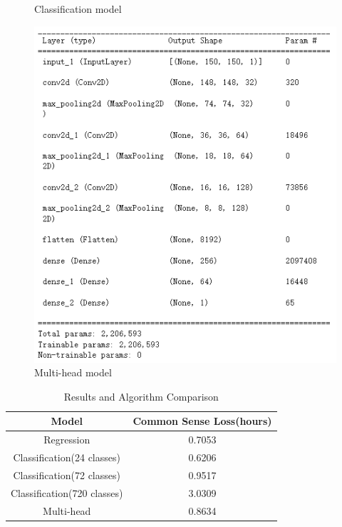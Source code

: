 \documentclass{article}
\begin{document}
\begin{figure}[!h]
\begin{minipage}[t]{0.3\textwidth}
		\caption{Classification model}
		\label{fig:classification}
	\end{minipage}
	\begin{minipage}[t]{0.3\textwidth}%
		\centering
		\includegraphics[width=\textwidth]{regression.png}
		\caption{Multi-head model}
		\label{fig:multi-head}
	\end{minipage}
\end{figure}
    \begin{table}[!ht]
	\caption{Results and Algorithm Comparison}
	\label{tab:performance}
	\centering
	\begin{tabular}{cc}
		\toprule
		\textbf{Model} & \textbf{Common Sense Loss(hours)} \\
		\midrule
		Regression & 0.7053 \\
		Classification(24 classes) & 0.6206 \\
		Classification(72 classes) & 0.9517 \\
		Classification(720 classes) & 3.0309 \\
		Multi-head & 0.8634 \\
		\bottomrule
	\end{tabular}
\end{table}
\end{document}
